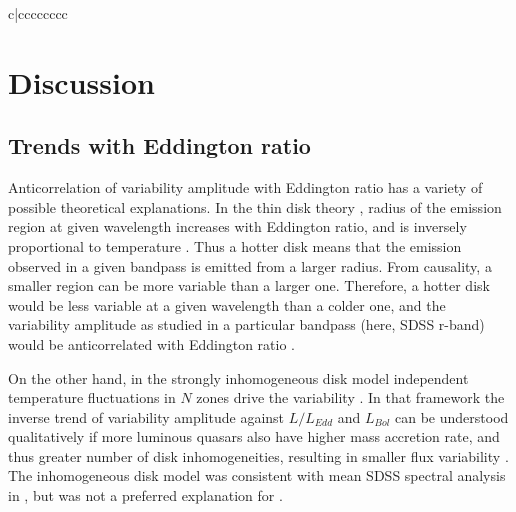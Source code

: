 \documentclass[twocolumn]{aastex62}
\begin{document}
\begin{deluxetable*}{c|cccccccc}
	\enddata
\end{deluxetable*}




\section{Discussion}
\label{sec:discussion}
\subsection{Trends with Eddington ratio}
Anticorrelation of  variability amplitude with Eddington ratio  has a variety of possible theoretical explanations. In the thin disk theory \citep{shakura1973, frank2002, netzer2013}, radius of the emission region at given wavelength increases with Eddington ratio, and is inversely proportional to temperature \citep{rakshit2017}. Thus a hotter disk means that the emission observed in a given bandpass is emitted from a larger radius. From causality, a smaller region can be more variable than a larger one. Therefore, a  hotter disk would be less variable at a given wavelength than a colder one, and  the variability amplitude as studied in a particular bandpass (here, SDSS r-band) would be anticorrelated with Eddington ratio \citep{fausnaugh2016,edelson2015}. 

On the other hand, in the strongly inhomogeneous disk model independent temperature fluctuations in $N$ zones drive the variability \citep{dexter2011}. In that framework the inverse trend of variability amplitude against $L/L_{Edd}$  and $L_{Bol}$  can be understood qualitatively if more luminous quasars also have higher mass accretion rate, and thus greater number of disk inhomogeneities, resulting in smaller flux variability \citep{simm2016}. The inhomogeneous disk model was consistent with mean SDSS spectral analysis in \citet{ruan2014}, but was not a preferred explanation for \citet{kokubo2015}. 
\end{document}
